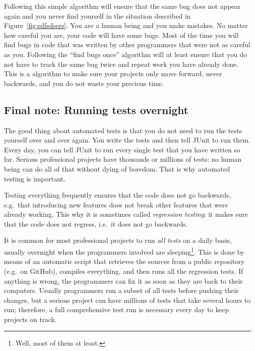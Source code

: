 Following this simple algorithm will ensure that the same bug does not
appear again and you never find yourself in the situation described in
Figure~\ref{fig:sdfsdsers}. You are a human being and you make mistakes. No
matter how careful you are, your code will have some bugs. Most of the
time you will find bugs in code that was written by other programmers
that were not as careful as you. Following the ``find bugs once''
algorithm will at least ensure that you do not have to track the same bug
twice and repeat work you have already done. This is a algorithm to make
sure your projects only move forward, never backwards, and you do not
waste your precious time. 

\subsection*{Final note: Running tests overnight}
\label{sec:runn-tests-overn}

The good thing about automated tests is that you do not need to run
the tests yourself over and over again. You write the tests and then
tell JUnit to run them. Every day, you can tell JUnit to run every
single test that you have written so far. Serious professional
projects have thousands or millions of tests: no human being can do
all of that without dying of boredom. That is why automated testing is
important. 

Testing everything frequently ensures that the code does not go
backwards, e.g.~that introducing new features does not break other
features that were already working. This why it is sometimes called
\emph{regression testing}: it makes sure that the code does not
regress, i.e.~it does not go backwards. 

It is common for most professional projects to run \emph{all tests}
on a daily basis, usually overnight when the programmers involved are
sleeping\footnote{Well, most of them at least.}. This is done by means
of an automatic script that retrieves the sources from a public
repository (e.g.~on GitHub), compiles everything, and then runs all
the regression tests. If anything is wrong, the programmers can fix it
as soon as they are back to their computers. Usually programmers run
a subset of all tests before pushing their changes, but a serious
project can have millions of tests that take several hours to run;
therefore, a full comprehensive test run is necessary every day to
keep projects on track. 



